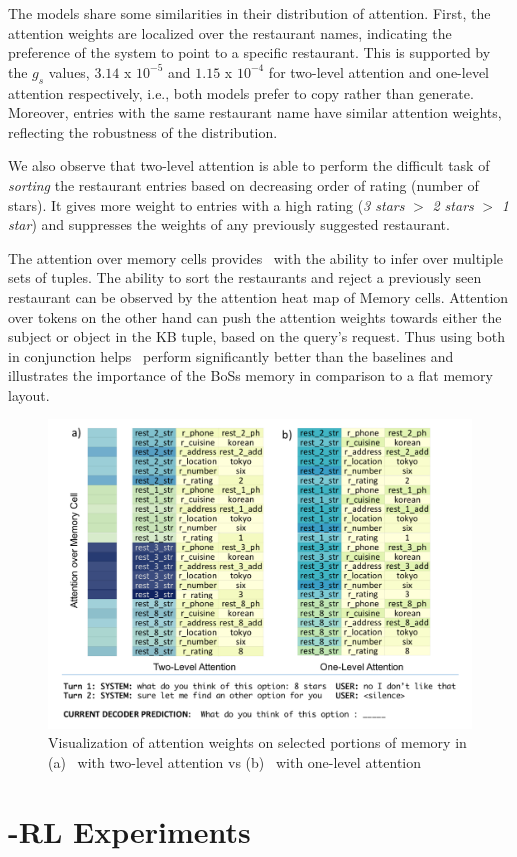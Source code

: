 The models share some similarities in their distribution of attention. First, the attention weights are localized over the restaurant names, indicating the preference of the system to point to a specific restaurant. This is supported by the $g_s$ values, $3.14$ x $10^{-5}$ and $1.15$ x $10^{-4}$ for two-level attention and one-level attention respectively, i.e., both models prefer to copy rather than generate. Moreover, entries with the same restaurant name have similar attention weights, reflecting the robustness of the distribution.

We also observe that two-level attention is able to perform the difficult task of {\em sorting} the restaurant entries based on decreasing order of rating (number of stars). It gives more weight to entries with a high rating 
(\textit{3 stars} $>$ \textit{2 stars} $>$ \textit{1 star})
and suppresses the weights of any previously suggested restaurant.

The attention over memory cells provides \sys\ with the ability to infer over multiple sets of tuples. The ability to sort the restaurants and reject a previously seen restaurant can be observed by the attention heat map of Memory cells. Attention over tokens on the other hand can push the attention weights towards either the subject or object in the KB tuple, based on the query's request. Thus using both in conjunction helps \sys\ perform significantly better than the baselines and illustrates the importance of the {\sc BoSs} memory in comparison to a flat memory layout.

\begin{figure}[ht]
\centering
\includegraphics[width=\textwidth]{assets/task3_two_level.png}
\caption{Visualization of attention weights on selected portions of memory in (a) \sys\ with two-level attention vs (b) \sys\ with one-level attention}
\label{fig:attention}
\end{figure}

\clearpage

\section{\sys -RL Experiments}